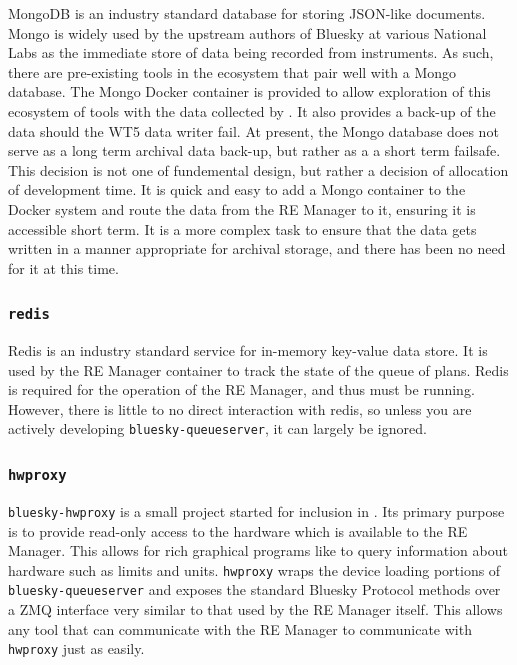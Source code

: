MongoDB\cite{} is an industry standard database for storing JSON-like documents.
Mongo is widely used by the upstream authors of Bluesky at various National Labs as the immediate store of data being recorded from instruments.
As such, there are pre-existing tools in the ecosystem that pair well with a Mongo database.
The Mongo Docker container is provided to allow exploration of this ecosystem of tools with the data collected by \biab.
It also provides a back-up of the data should the WT5 data writer fail.
At present, the Mongo database does not serve as a long term archival data back-up, but rather as a a short term failsafe.
This decision is not one of fundemental design, but rather a decision of allocation of development time.
It is quick and easy to add a Mongo container to the Docker system and route the data from the RE Manager to it, ensuring it is accessible short term.
It is a more complex task to ensure that the data gets written in a manner appropriate for archival storage, and there has been no need for it at this time.

\subsubsection{\texttt{redis}}

Redis\cite{} is an industry standard service for in-memory key-value data store.
It is used by the RE Manager container to track the state of the queue of plans.
Redis is required for the operation of the RE Manager, and thus must be running.
However, there is little to no direct interaction with redis, so unless you are actively developing \texttt{bluesky-queueserver}, it can largely be ignored.

\subsubsection{\texttt{hwproxy}}

\texttt{bluesky-hwproxy}\cite{} is a small project started for inclusion in \biab.
Its primary purpose is to provide read-only access to the hardware which is available to the RE Manager.
This allows for rich graphical programs like \blueskycmds to query information about hardware such as limits and units.
\texttt{hwproxy} wraps the device loading portions of \texttt{bluesky-queueserver} and exposes the standard Bluesky Protocol methods over a ZMQ interface very similar to that used by the RE Manager itself.
This allows any tool that can communicate with the RE Manager to communicate with \texttt{hwproxy} just as easily.

